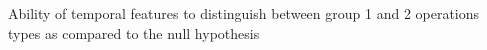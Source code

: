 Ability of temporal features to distinguish between group 1 and 2 operations types as compared to the null hypothesis
\label{sec:operationstypes_nullhypth}
